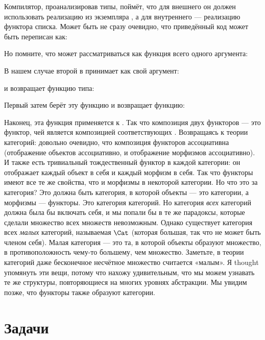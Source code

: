 Компилятор, проанализировав типы, поймёт, что для внешнего  он должен использовать реализацию из экземпляра , а для внутреннего — реализацию функтора списка. Может быть не сразу очевидно, что приведённый код может быть переписан как:

Но помните, что  может рассматриваться как функция всего одного аргумента:

В нашем случае второй  в  принимает как свой аргумент:

и возвращает функцию типа:

Первый  затем берёт эту функцию и возвращает функцию:

Наконец, эта функция применяется к . Так что композиция двух функторов — это функтор, чей  является композицией соответствующих . Возвращаясь к теории категорий: довольно очевидно, что композиция функторов ассоциативна (отображение объектов ассоциативно, и отображение морфизмов ассоциативно). И также есть тривиальный тождественный функтор в каждой категории: он отображает каждый объект в себя и каждый морфизм в себя. Так что функторы имеют все те же свойства, что и морфизмы в некоторой категории. Но что это за категория? Это должна быть категория, в которой объекты — это категории, а морфизмы — функторы. Это категория категорий. Но категория \emph{всех} категорий должна была бы включать себя, и мы попали бы в те же парадоксы, которые сделали множество всех множеств невозможным. Однако существует категория всех \emph{малых} категорий, называемая $\Cat$ (которая большая, так что не может быть членом себя). Малая категория — это та, в которой объекты образуют множество, в противоположность чему-то большему, чем множество. Заметьте, в теории категорий даже бесконечное несчётное множество считается «малым». Я thought упомянуть эти вещи, потому что нахожу удивительным, что мы можем узнавать те же структуры, повторяющиеся на многих уровнях абстракции. Мы увидим позже, что функторы также образуют категории.

\section{Задачи}

